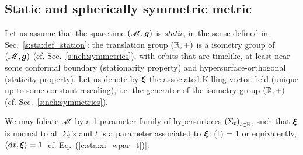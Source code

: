 \subsection{Static and spherically symmetric metric} \label{s:sch:static_spher}

Let us assume that the spacetime $(\mathscr{M},\bm{g})$ is \emph{static}, in the sense defined in Sec.~\ref{s:sta:def_station}:
the translation group $(\mathbb{R},+)$ is a isometry group of $(\mathscr{M},\bm{g})$
(cf. Sec.~\ref{s:neh:symmetries}), with orbits that are timelike, at least near
some conformal boundary (stationarity property) and hypersurface-orthogonal (staticity property). Let us denote by $\bm{\xi}$ the associated Killing vector
field (unique up to some constant rescaling), i.e. the generator of the
isometry group $(\mathbb{R},+)$ (cf. Sec.~\ref{s:neh:symmetries}).

We may foliate $\mathscr{M}$ by a 1-parameter family of hypersurfaces
$\left(\Sigma_t\right)_{t\in\mathbb{R}}$, such that $\bm{\xi}$ is normal to
all $\Sigma_t$'s and $t$ is a parameter associated to $\bm{\xi}$:
\be \label{e:sch:xi_t}
    \w{\xi}(t) = 1
\ee
or equivalently, $\langle \mathbf{d} t , \bm{\xi} \rangle = 1$ [cf. Eq.~(\ref{e:sta:xi_wpar_t})].

